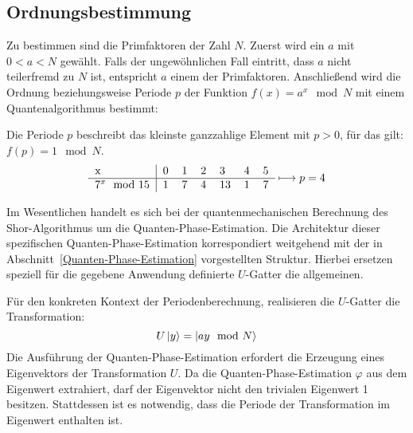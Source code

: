 \subsection{Ordnungsbestimmung} \label{Shor:Ordnungsbestimmung}
Zu bestimmen sind die Primfaktoren der Zahl \(N\).
Zuerst wird ein \(a\) mit \(0 < a < N\) gewählt.
Falls der ungewöhnlichen Fall eintritt, dass \(a\) nicht teilerfremd zu \(N\) ist, entspricht \(a\) einem der Primfaktoren.
Anschließend wird die Ordnung beziehungsweise Periode \(p\) der Funktion \({f(x) = a^x \mod N}\) mit einem Quantenalgorithmus bestimmt:

Die Periode \(p\) beschreibt das kleinste ganzzahlige Element mit \({p > 0}\), für das gilt: \({f(p) = 1 \mod N}\).
\[
\begin{tabular}{l|llllll}
    x     &     0     &     1       &     2      &      3   &  4 &  5  \\ \hline
    \(7^x \mod 15\)    &      1     &        7     &       4     &     13     &  1 &  7 
\end{tabular} \longmapsto p = 4
\]

Im Wesentlichen handelt es sich bei der quantenmechanischen Berechnung des Shor-Algorithmus um die Quanten-Phase-Estimation.
Die Architektur dieser spezifischen Quanten-Phase-Estimation korrespondiert weitgehend mit der in Abschnitt~\ref{Quanten-Phase-Estimation} vorgestellten Struktur.
Hierbei ersetzen speziell für die gegebene Anwendung definierte \(U\)-Gatter die allgemeinen.

Für den konkreten Kontext der Periodenberechnung, realisieren die \(U\)-Gatter die Transformation:
\[U\ket{y} = \ket{ay \mod N}\] 
Die Ausführung der Quanten-Phase-Estimation erfordert die Erzeugung eines Eigenvektors der Transformation \(U\).
Da die Quanten-Phase-Estimation \(\varphi\) aus dem Eigenwert extrahiert, 
darf der Eigenvektor nicht den trivialen Eigenwert 1 besitzen.
Stattdessen ist es notwendig, dass die Periode der Transformation im Eigenwert enthalten ist.

